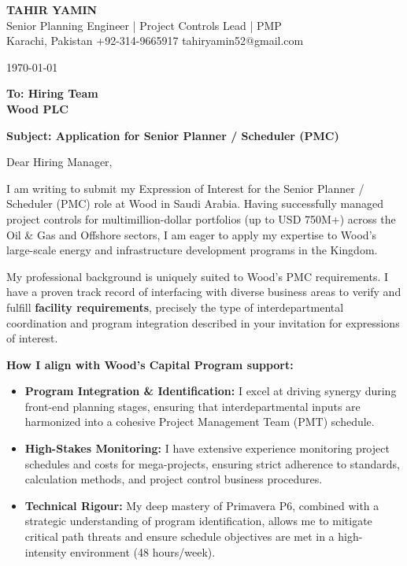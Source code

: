 \documentclass[11pt,a4paper]{article}
\begin{document}
\begin{center}
    {\Huge \textbf{\color{awesome-darknight} TAHIR YAMIN}} \\[0.2cm]
    {\Large \color{awesome-gray} Senior Planning Engineer | Project Controls Lead | PMP} \\[0.3cm]
    
    \small \color{light-gray}
    Karachi, Pakistan \quad \textbullet \quad 
    +92-314-9665917 \quad \textbullet \quad 
    tahiryamin52@gmail.com
\end{center}

\vspace{0.8cm}
\today
\vspace{0.5cm}

\textbf{To: Hiring Team} \\
\textbf{Wood PLC} \\
\vspace{0.5cm}

\textbf{Subject: Application for Senior Planner / Scheduler (PMC)}

\vspace{0.5cm}

Dear Hiring Manager,

I am writing to submit my Expression of Interest for the Senior Planner / Scheduler (PMC) role at Wood in Saudi Arabia. Having successfully managed project controls for multimillion-dollar portfolios (up to USD 750M+) across the Oil \& Gas and Offshore sectors, I am eager to apply my expertise to Wood’s large-scale energy and infrastructure development programs in the Kingdom.

My professional background is uniquely suited to Wood's PMC requirements. I have a proven track record of interfacing with diverse business areas to verify and fulfill \textbf{facility requirements}, precisely the type of interdepartmental coordination and program integration described in your invitation for expressions of interest.

\textbf{How I align with Wood's Capital Program support:}
\begin{itemize}
    \item \textbf{Program Integration \& Identification:} I excel at driving synergy during front-end planning stages, ensuring that interdepartmental inputs are harmonized into a cohesive Project Management Team (PMT) schedule.
    \item \textbf{High-Stakes Monitoring:} I have extensive experience monitoring project schedules and costs for mega-projects, ensuring strict adherence to standards, calculation methods, and project control business procedures.
    \item \textbf{Technical Rigour:} My deep mastery of Primavera P6, combined with a strategic understanding of program identification, allows me to mitigate critical path threats and ensure schedule objectives are met in a high-intensity environment (48 hours/week).
\end{itemize}
\end{document}
